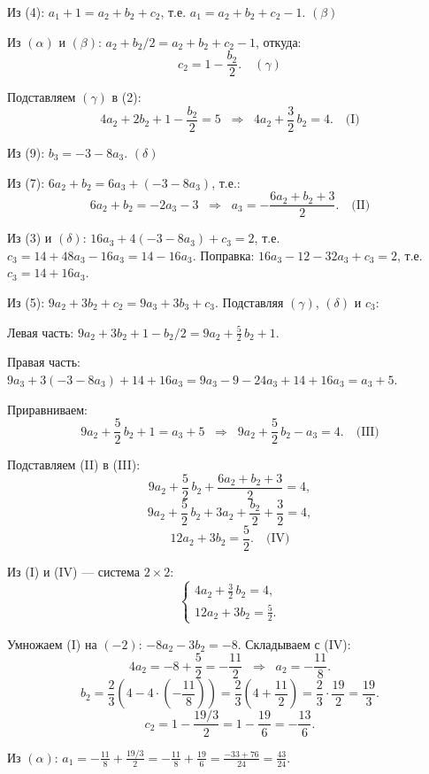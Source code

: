 Из (4): $a_1 + 1 = a_2 + b_2 + c_2$, т.е. $a_1 = a_2 + b_2 + c_2 - 1$. \quad $(\beta)$

Из $(\alpha)$ и $(\beta)$: $a_2 + b_2/2 = a_2 + b_2 + c_2 - 1$, откуда:
\[
    c_2 = 1 - \frac{b_2}{2}. \quad (\gamma)
\]

Подставляем $(\gamma)$ в (2):
\[
    4a_2 + 2b_2 + 1 - \frac{b_2}{2} = 5 \;\;\Longrightarrow\;\; 4a_2 + \frac{3}{2}\,b_2 = 4. \quad \text{(I)}
\]

Из (9): $b_3 = -3 - 8a_3$. \quad $(\delta)$

Из (7): $6a_2 + b_2 = 6a_3 + (-3 - 8a_3)$, т.е.:
\[
    6a_2 + b_2 = -2a_3 - 3 \;\;\Longrightarrow\;\; a_3 = -\frac{6a_2 + b_2 + 3}{2}. \quad \text{(II)}
\]

Из (3) и $(\delta)$: $16a_3 + 4(-3 - 8a_3) + c_3 = 2$, т.е. $c_3 = 14 + 48a_3 - 16a_3 = 14 - 16a_3$. Поправка: $16a_3 - 12 - 32a_3 + c_3 = 2$, т.е. $c_3 = 14 + 16a_3$.

Из (5): $9a_2 + 3b_2 + c_2 = 9a_3 + 3b_3 + c_3$. Подставляя $(\gamma)$, $(\delta)$ и $c_3$:

Левая часть: $9a_2 + 3b_2 + 1 - b_2/2 = 9a_2 + \frac{5}{2}\,b_2 + 1$.

Правая часть: $9a_3 + 3(-3 - 8a_3) + 14 + 16a_3 = 9a_3 - 9 - 24a_3 + 14 + 16a_3 = a_3 + 5$.

Приравниваем:
\[
    9a_2 + \frac{5}{2}\,b_2 + 1 = a_3 + 5 \;\;\Longrightarrow\;\; 9a_2 + \frac{5}{2}\,b_2 - a_3 = 4. \quad \text{(III)}
\]

Подставляем (II) в (III):
\[
    9a_2 + \frac{5}{2}\,b_2 + \frac{6a_2 + b_2 + 3}{2} = 4,
\]
\[
    9a_2 + \frac{5}{2}\,b_2 + 3a_2 + \frac{b_2}{2} + \frac{3}{2} = 4,
\]
\[
    12a_2 + 3b_2 = \frac{5}{2}. \quad \text{(IV)}
\]

Из (I) и (IV) --- система $2 \times 2$:
\[
    \begin{cases}
        4a_2 + \frac{3}{2}\,b_2 = 4, \\
        12a_2 + 3b_2 = \frac{5}{2}.
    \end{cases}
\]

Умножаем (I) на $(-2)$: $-8a_2 - 3b_2 = -8$. Складываем с (IV):
\[
    4a_2 = -8 + \frac{5}{2} = -\frac{11}{2} \;\;\Longrightarrow\;\; a_2 = -\frac{11}{8}.
\]
\[
    b_2 = \frac{2}{3}\left(4 - 4 \cdot \left(-\frac{11}{8}\right)\right) = \frac{2}{3}\left(4 + \frac{11}{2}\right) = \frac{2}{3} \cdot \frac{19}{2} = \frac{19}{3}.
\]
\[
    c_2 = 1 - \frac{19/3}{2} = 1 - \frac{19}{6} = -\frac{13}{6}.
\]

Из $(\alpha)$: $a_1 = -\frac{11}{8} + \frac{19/3}{2} = -\frac{11}{8} + \frac{19}{6} = \frac{-33 + 76}{24} = \frac{43}{24}$.

